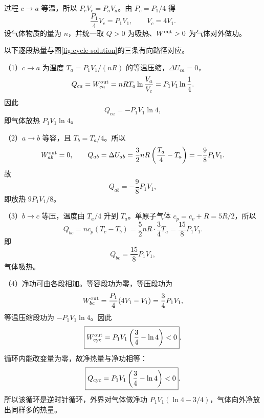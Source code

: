 \begin{xesolution}
过程 $c\to a$ 等温，所以 $P_cV_c=P_aV_a$。由 $P_c=P_1/4$ 得
\begin{equation*}
  \frac{P_1}{4}V_c=P_1V_1,
  \qquad
  \boxed{V_c=4V_1}.
\end{equation*}
设气体物质的量为 $n$，并统一取 $Q>0$ 为吸热、$W^{\rm out}>0$ 为气体对外做功。

\cycleExampleDiagram
{}\label{fig:cycle-solution}
以下逐段热量与图\ref{fig:cycle-solution}的三条有向路径对应。

（1）$c\to a$ 为温度 $T_a=P_1V_1/(nR)$ 的等温压缩，$\Delta U_{ca}=0$，
\begin{equation*}
  Q_{ca}=W^{\rm out}_{ca}
  =nRT_a\ln\frac{V_a}{V_c}
  =P_1V_1\ln\frac14.
\end{equation*}
因此
\begin{equation}
  \boxed{Q_{ca}=-P_1V_1\ln4},
\end{equation}
即气体放热 $P_1V_1\ln4$。

（2）$a\to b$ 等容，且 $T_b=T_a/4$。所以
\begin{equation*}
  W^{\rm out}_{ab}=0,
  \qquad
  Q_{ab}=\Delta U_{ab}
  =\frac32nR\left(\frac{T_a}{4}-T_a\right)
  =-\frac98P_1V_1.
\end{equation*}
故
\begin{equation}
  \boxed{Q_{ab}=-\frac98P_1V_1},
\end{equation}
即放热 $9P_1V_1/8$。

（3）$b\to c$ 等压，温度由 $T_a/4$ 升到 $T_a$。单原子气体 $c_p=c_v+R=5R/2$，所以
\begin{equation*}
  Q_{bc}=nc_p(T_c-T_b)
  =\frac52nR\cdot\frac34T_a
  =\frac{15}{8}P_1V_1.
\end{equation*}
即
\begin{equation}
  \boxed{Q_{bc}=\frac{15}{8}P_1V_1},
\end{equation}
气体吸热。

（4）净功可由各段相加。等容段功为零，等压段功为
\begin{equation*}
  W^{\rm out}_{bc}=\frac{P_1}{4}(4V_1-V_1)=\frac34P_1V_1,
\end{equation*}
等温压缩段功为 $-P_1V_1\ln4$。因此
\begin{equation}
  \boxed{W^{\rm out}_{\rm cyc}=P_1V_1\left(\frac34-\ln4\right)<0}.
\end{equation}
循环内能改变量为零，故净热量与净功相等：
\begin{equation}
  \boxed{Q_{\rm cyc}=P_1V_1\left(\frac34-\ln4\right)<0}.
\end{equation}
所以该循环是逆时针循环，外界对气体做净功
$P_1V_1(\ln4-3/4)$，气体向外净放出同样多的热量。
\end{xesolution}

